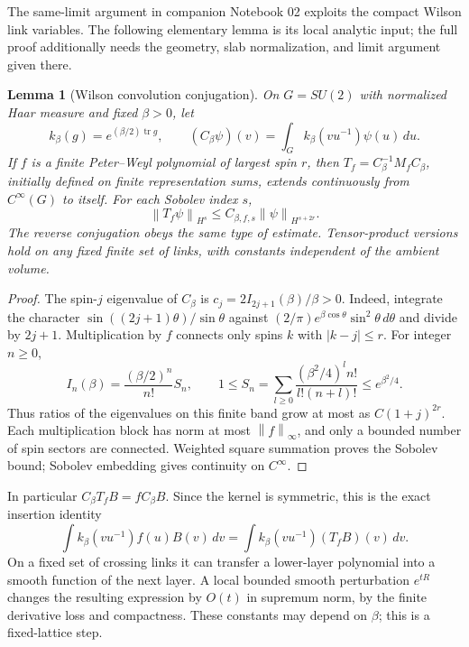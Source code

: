 \documentclass[11pt]{article}
\newtheorem{lemma}[proposition]{Lemma}
\theoremstyle{remark}
\newcommand{\tr}{\operatorname{tr}}
\newcommand{\norm}[1]{\left\|#1\right\|}
\begin{document}
The same-limit argument in companion Notebook 02 exploits the compact
Wilson link variables. The following elementary lemma is its local
analytic input; the full proof additionally needs the geometry, slab
normalization, and limit argument given there.

\begin{lemma}[Wilson convolution conjugation]
On $G=SU(2)$ with normalized Haar measure and fixed $\beta>0$, let
\[
 k_\beta(g)=e^{(\beta/2)\tr g},\qquad
 (C_\beta\psi)(v)=\int_Gk_\beta(vu^{-1})\psi(u)\,du.
\]
If $f$ is a finite Peter--Weyl polynomial of largest spin $r$, then
$T_f=C_\beta^{-1}M_fC_\beta$, initially defined on finite representation
sums, extends continuously from $C^\infty(G)$ to itself. For each
Sobolev index $s$,
\[
 \norm{T_f\psi}_{H^s}\leq C_{\beta,f,s}
                         \norm\psi_{H^{s+2r}}.
\]
The reverse conjugation obeys the same type of estimate. Tensor-product
versions hold on any fixed finite set of links, with constants
independent of the ambient volume.
\end{lemma}
\begin{proof}
The spin-$j$ eigenvalue of $C_\beta$ is
$c_j=2I_{2j+1}(\beta)/\beta>0$. Indeed, integrate the character
$\sin((2j+1)\theta)/\sin\theta$ against
$(2/\pi)e^{\beta\cos\theta}\sin^2\theta\,d\theta$ and divide by
$2j+1$. Multiplication by $f$ connects only spins $k$ with
$|k-j|\leq r$. For integer $n\geq0$,
\[
 I_n(\beta)=\frac{(\beta/2)^n}{n!}S_n,\qquad
 1\leq S_n=\sum_{l\geq0}\frac{(\beta^2/4)^l n!}{l!(n+l)!}
               \leq e^{\beta^2/4}.
\]
Thus ratios of the eigenvalues on this finite band grow at most as
$C(1+j)^{2r}$. Each multiplication block has norm at most
$\norm f_\infty$, and only a bounded number of spin sectors are
connected. Weighted square summation proves the Sobolev bound;
Sobolev embedding gives continuity on $C^\infty$.
\end{proof}

In particular $C_\beta T_fB=fC_\beta B$. Since the kernel is symmetric,
this is the exact insertion identity
\[
 \int k_\beta(vu^{-1})f(u)B(v)\,dv
 =\int k_\beta(vu^{-1})(T_fB)(v)\,dv.
\]
On a fixed set of crossing links it can transfer a lower-layer
polynomial into a smooth function of the next layer. A local bounded
smooth perturbation $e^{tR}$ changes the resulting expression by
$O(t)$ in supremum norm, by the finite derivative loss and compactness.
These constants may depend on $\beta$; this is a fixed-lattice step.
\end{document}
